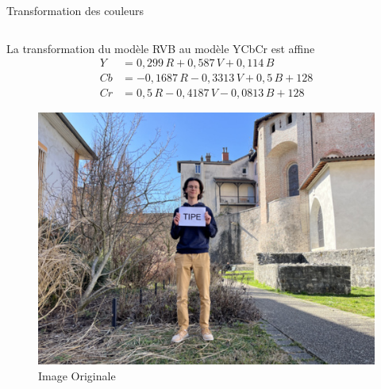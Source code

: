 \documentclass[xcolor=dvipsnames]{beamer}
\begin{document}
\begin{frame}{Transformation des couleurs}

    \begin{columns}

        \begin{column}{0.4\textwidth}
            \scriptsize La transformation du modèle RVB au modèle YCbCr est affine
            \tiny
            \begin{align*}
                Y &= 0,299 \, R + 0,587 \, V + 0,114 \, B \\
                Cb &= -0,1687 \, R - 0,3313 \, V + 0,5 \, B + 128 \\
                Cr &= 0,5 \, R - 0,4187 \, V - 0,0813 \, B + 128
            \end{align*}
            \begin{figure}
                \centering
                \includegraphics[width=1\linewidth]{principale_1000_750_smooth.jpg}
                \caption{Image Originale}
            \end{figure}
        \end{column}
        

\end{columns}
\end{frame}
\end{document}
